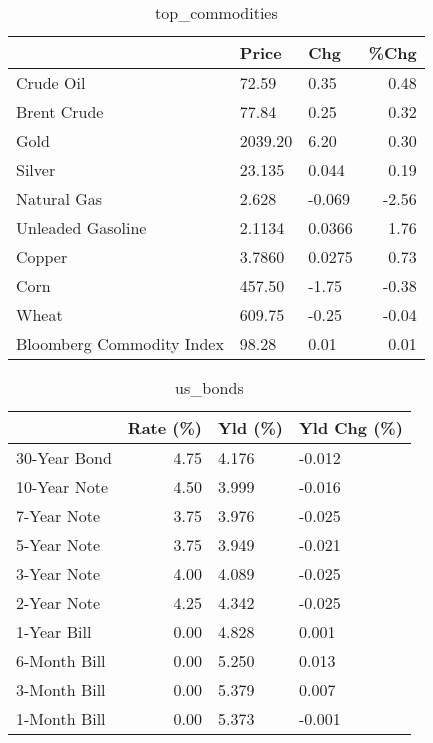 \documentclass{article}%
\begin{document}
\begin{table}[htbp]%
\caption{top\_commodities}%
\centering%
\begin{adjustbox}{width=1\textwidth}%
\begin{tabular}{lllr}
\toprule
                          &   Price &    Chg &  \%Chg \\
\midrule
               Crude Oil  &   72.59 &   0.35 &  0.48 \\
             Brent Crude  &   77.84 &   0.25 &  0.32 \\
                    Gold  & 2039.20 &   6.20 &  0.30 \\
                  Silver  &  23.135 &  0.044 &  0.19 \\
             Natural Gas  &   2.628 & -0.069 & -2.56 \\
       Unleaded Gasoline  &  2.1134 & 0.0366 &  1.76 \\
                  Copper  &  3.7860 & 0.0275 &  0.73 \\
                    Corn  &  457.50 &  -1.75 & -0.38 \\
                   Wheat  &  609.75 &  -0.25 & -0.04 \\
Bloomberg Commodity Index &   98.28 &   0.01 &  0.01 \\
\bottomrule
\end{tabular}
%
\end{adjustbox}%
\end{table}

%


\begin{table}[htbp]%
\caption{us\_bonds}%
\centering%
\begin{adjustbox}{width=1\textwidth}%
\begin{tabular}{lrll}
\toprule
             &  Rate (\%) & Yld (\%) & Yld Chg (\%) \\
\midrule
30-Year Bond &      4.75 &   4.176 &      -0.012 \\
10-Year Note &      4.50 &   3.999 &      -0.016 \\
 7-Year Note &      3.75 &   3.976 &      -0.025 \\
 5-Year Note &      3.75 &   3.949 &      -0.021 \\
 3-Year Note &      4.00 &   4.089 &      -0.025 \\
 2-Year Note &      4.25 &   4.342 &      -0.025 \\
 1-Year Bill &      0.00 &   4.828 &       0.001 \\
6-Month Bill &      0.00 &   5.250 &       0.013 \\
3-Month Bill &      0.00 &   5.379 &       0.007 \\
1-Month Bill &      0.00 &   5.373 &      -0.001 \\
\bottomrule
\end{tabular}
%
\end{adjustbox}%
\end{table}
\end{document}
